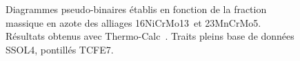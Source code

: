 \begin{figure}[!ht]
  \centering
  \hfill

  \caption{\label{fig:pseudo_binaires_azote}Diagrammes pseudo-binaires  établis en fonction de la fraction massique en azote des alliages \protect{} 16NiCrMo13 et \protect{} 23MnCrMo5. Résultats obtenus avec  Thermo-Calc~\cite{Andersson2002,Borgenstam2000}. Traits pleins base de données SSOL4, pontillés TCFE7.}
\end{figure}

